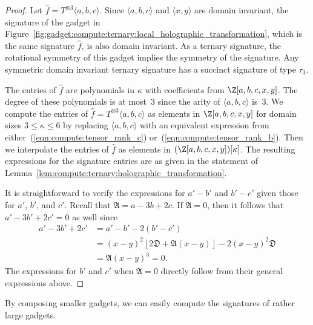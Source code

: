 \documentclass[11pt]{article}
\begin{document}
\begin{proof}
 Let $\widehat{f} = T^{\otimes 3} \langle a,b,c \rangle$.
 Since $\langle a,b,c \rangle$ and $\langle x,y \rangle$ are domain invariant,
 the signature of the gadget in Figure~\ref{fig:gadget:compute:ternary:local_holographic_transformation},
 which is the same signature $\widehat{f}$,
 is also domain invariant.
 As a ternary signature,
 the rotational symmetry of this gadget implies the symmetry of the signature.
 Any symmetric domain invariant ternary signature has a succinct signature of type $\tau_3$.
 
 The entries of $\widehat{f}$ are polynomials in $\kappa$ with coefficients from $\Z[a,b,c,x,y]$.
 The degree of these polynomials is at most~$3$ since the arity of $\langle a,b,c \rangle$ is~$3$.
 We compute the entries of $\widehat{f} = T^{\otimes 3} \langle a,b,c \rangle$ as elements in $\Z[a,b,c,x,y]$
 for domain sizes $3 \le \kappa \le 6$ by replacing $\langle a,b,c \rangle$ with an equivalent expression from either~(\ref{eqn:compute:tensor_rank_c}) or~(\ref{eqn:compute:tensor_rank_b}).
 Then we interpolate the entries of $\widehat{f}$ as elements in $(\Z[a,b,c,x,y])[\kappa]$.
 The resulting expressions for the signature entries are as given in the statement of Lemma~\ref{lem:compute:ternary:holographic_transformation}.
 
 It is straightforward to verify the expressions for $a' - b'$ and $b' - c'$ given those for $a'$, $b'$, and $c'$.
 Recall that $\mathfrak{A} = a - 3 b + 2 c$.
 If $\mathfrak{A} = 0$,
 then it follows that $a' - 3 b' + 2 c' = 0$ as well since
 \begin{align*}
  a' - 3 b' + 2 c'
  &= a' - b' - 2 (b' - c')\\
  &= (x - y)^2 [2 \mathfrak{D} + \mathfrak{A} (x - y)] - 2 (x - y)^2 \mathfrak{D}\\
  &= \mathfrak{A} (x - y)^3
  = 0.
 \end{align*}
 The expressions for $b'$ and $c'$ when $\mathfrak{A} = 0$ directly follow from their general expressions above.
\end{proof}

By composing smaller gadgets,
we can easily compute the signatures of rather large gadgets.
\end{document}
